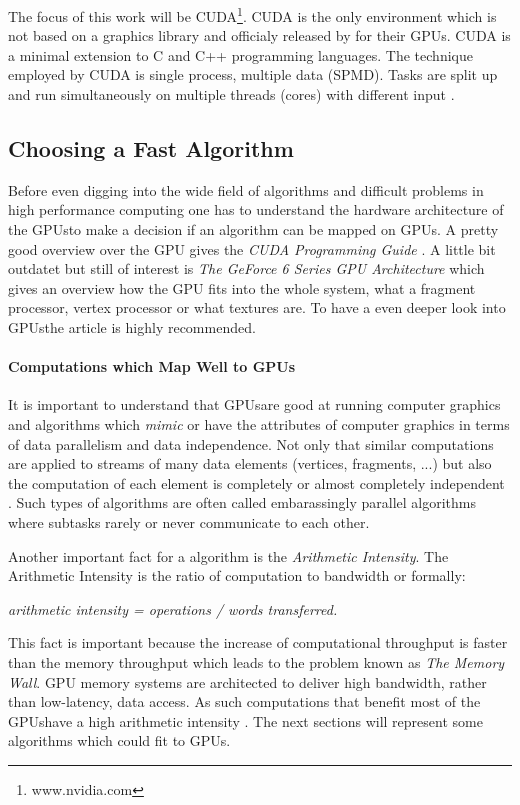 The focus of this work will be CUDA\footnote{www.nvidia.com}. \gls{CUDA} is the only
environment which is not based on a graphics library and officialy released by
{} for their GPUs. \gls{CUDA} is a minimal extension to C and C++ programming
languages. The technique employed by \gls{CUDA} is single process, multiple data
(SPMD). Tasks are split up and run simultaneously on multiple threads (cores)
with different input \citep{citeulike:3072519}.

\subsection*{Choosing a Fast Algorithm} %
\label{ssub:choosing_a_fast_algorithm}
Before even digging into the wide field of algorithms and difficult problems in
high performance computing one has to understand the hardware architecture of
the \glspl{GPU}to make a decision if an algorithm can be mapped on GPUs. A pretty good
overview over the {} \gls{GPU} gives the \emph{{} \gls{CUDA} Programming Guide}
\citep{citeulike:3325943}. A little bit outdatet but still of interest is
\emph{The GeForce 6 Series \gls{GPU} Architecture}\citep{citeulike:3757915} which gives
an overview how the \gls{GPU} fits into the whole system, what a fragment processor,
vertex processor or what textures are. To have a even deeper look into \glspl{GPU}the
article \citep{citeulike:2790995} is highly recommended.

\paragraph{Computations which Map Well to GPUs} %
\label{par:computations_which_map_well_to_GPUs}
It is important to understand that \glspl{GPU}are good at running computer graphics
and algorithms which \emph{mimic} or have the attributes of computer graphics in
terms of data parallelism and data independence. Not only that similar
computations are applied to streams of many data elements (vertices, fragments,
...) but also the computation of each element is completely or almost completely
independent \citep{citeulike:3733428}. Such types of algorithms are often called
embarassingly parallel algorithms where subtasks rarely or never communicate to
each other.

Another important fact for a algorithm is the \emph{Arithmetic Intensity}. The
Arithmetic Intensity is the ratio of computation to bandwidth or formally:
\begin{center} 
 \emph{arithmetic intensity = operations / words transferred.}
\end{center}
This fact is important because the increase of computational throughput is
faster than the memory throughput which leads to the problem known as \emph{The
Memory Wall}. \gls{GPU} memory systems are architected to deliver high bandwidth,
rather than low-latency, data access. As such computations that benefit most of
the \glspl{GPU}have a high arithmetic intensity \citep{citeulike:3733428}. The next 
sections will represent some algorithms which could fit to GPUs. 

